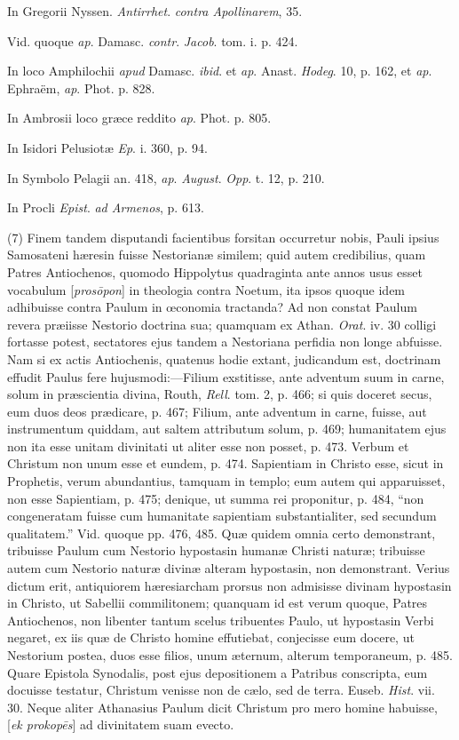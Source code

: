 In Gregorii Nyssen. \emph{Antirrhet}. \emph{contra
Apollinarem}, 35.

Vid. quoque \emph{ap}. Damasc. \emph{contr}. \emph{Jacob}.
tom. i. p. 424.

In loco Amphilochii \emph{apud} Damasc. \emph{ibid}.
et \emph{ap}. Anast. \emph{Hodeg}. 10, p. 162, et \emph{ap}. Ephraëm,
\emph{ap}. Phot. p. 828.

In Ambrosii loco græce reddito \emph{ap}. Phot.
p. 805.

In Isidori Pelusiotæ \emph{Ep}. i. 360, p. 94.

In Symbolo Pelagii an. 418, \emph{ap}. \emph{August}.
\emph{Opp}. t. 12, p. 210.

In Procli \emph{Epist}. \emph{ad Armenos}, p.
613.

(7) Finem tandem disputandi facientibus forsitan
occurretur nobis, Pauli ipsius Samosateni hæresin fuisse Nestorianæ
similem; quid autem credibilius, quam Patres Antiochenos, quomodo
Hippolytus quadraginta ante annos usus esset vocabulum [\emph{pros\={o}pon}]
in theologia contra Noetum, ita ipsos quoque idem adhibuisse contra
Paulum in œconomia tractanda? Ad non constat Paulum revera præiisse
Nestorio doctrina sua; quamquam ex Athan. \emph{Orat}. iv. 30 colligi
fortasse potest, sectatores ejus tandem a Nestoriana perfidia non
longe abfuisse. Nam si ex actis Antiochenis, quatenus hodie extant,
judicandum est, doctrinam effudit Paulus fere hujusmodi:—Filium
exstitisse, ante adventum suum in carne, solum in præscientia divina,
Routh, \emph{Rell}. tom. 2, p. 466; si quis doceret secus, eum duos
deos prædicare, p. 467; Filium, ante adventum in carne, fuisse, aut
instrumentum quiddam, aut saltem attributum solum, p. 469; humanitatem
ejus non ita esse unitam divinitati ut aliter esse non posset, p. 473.
Verbum et Christum non unum esse et eundem, p. 474. Sapientiam in
Christo esse, sicut in Prophetis, verum abundantius, tamquam in templo;
eum autem qui apparuisset, non esse Sapientiam, p. 475; denique, ut
summa rei proponitur, p. 484, ``non congeneratam fuisse cum humanitate
sapientiam substantialiter, sed secundum qualitatem.'' Vid. quoque pp.
476, 485. Quæ quidem omnia certo demonstrant, tribuisse Paulum
cum Nestorio hypostasin humanæ Christi naturæ; tribuisse autem cum
Nestorio naturæ divinæ alteram hypostasin, non demonstrant. Verius
dictum erit, antiquiorem hæresiarcham prorsus non admisisse divinam
hypostasin in Christo, ut Sabellii commilitonem; quanquam id est verum
quoque, Patres Antiochenos, non libenter tantum scelus tribuentes
Paulo, ut hypostasin Verbi negaret, ex iis quæ de Christo homine
effutiebat, conjecisse eum docere, ut Nestorium postea, duos esse
filios, unum æternum, alterum temporaneum, p. 485. Quare Epistola
Synodalis, post ejus depositionem a Patribus conscripta, eum docuisse
testatur, Christum venisse non de cælo, sed de terra. Euseb. \emph{Hist}.
vii. 30. Neque aliter Athanasius Paulum dicit Christum pro mero homine
habuisse, [\emph{ek prokop\={e}s}] ad divinitatem suam evecto.

